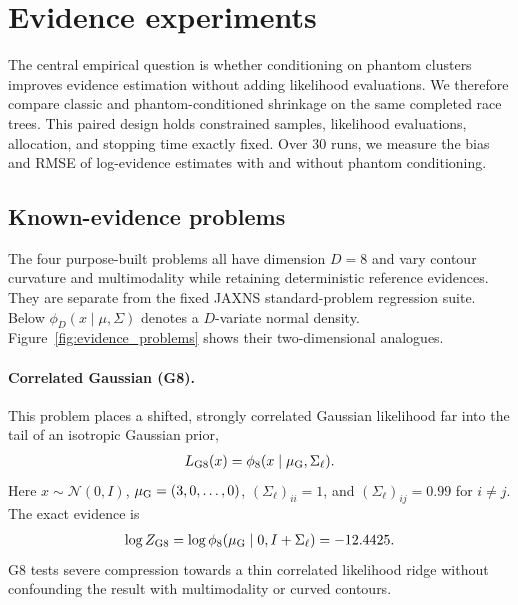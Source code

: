 \documentclass[pdflatex,sn-basic,icol]{sn-jnl}
\theoremstyle{plain}
\theoremstyle{definition}
\begin{document}
\clearpage
\section{Evidence experiments}\label{sec:experiments}

The central empirical question is whether conditioning on phantom clusters improves evidence estimation without adding likelihood evaluations.
We therefore compare classic and phantom-conditioned shrinkage on the same completed race trees.
This paired design holds constrained samples, likelihood evaluations, allocation, and stopping time exactly fixed.
Over 30 runs, we measure the bias and RMSE of log-evidence estimates with and without phantom conditioning.

\subsection{Known-evidence problems}

The four purpose-built problems all have dimension $D=8$ and vary contour curvature and multimodality while retaining deterministic reference evidences.
They are separate from the fixed JAXNS standard-problem regression suite.
Below $\phi_D(x\mid\mu,\Sigma)$ denotes a $D$-variate normal density.
Figure~\ref{fig:evidence_problems} shows their two-dimensional analogues.

\paragraph{Correlated Gaussian (G8).}
This problem places a shifted, strongly correlated Gaussian likelihood far into the tail of an isotropic Gaussian prior,
\begin{align}
    L_{\rm G8}(x) = \phi_8(x\mid\mu_{\rm G},\Sigma_\ell). \label{eq:g8_likelihood}
\end{align}
Here $x\sim\mathcal{N}(0,I)$, $\mu_{\rm G}=(3,0,\ldots,0)$, $(\Sigma_\ell)_{ii}=1$, and $(\Sigma_\ell)_{ij}=0.99$ for $i\ne j$.
The exact evidence is
\begin{align}
    \log Z_{\rm G8}
    = \log\phi_8(\mu_{\rm G}\mid0,I+\Sigma_\ell)
    = -12.4425. \label{eq:g8_evidence}
\end{align}
G8 tests severe compression towards a thin correlated likelihood ridge without confounding the result with multimodality or curved contours.
\end{document}
